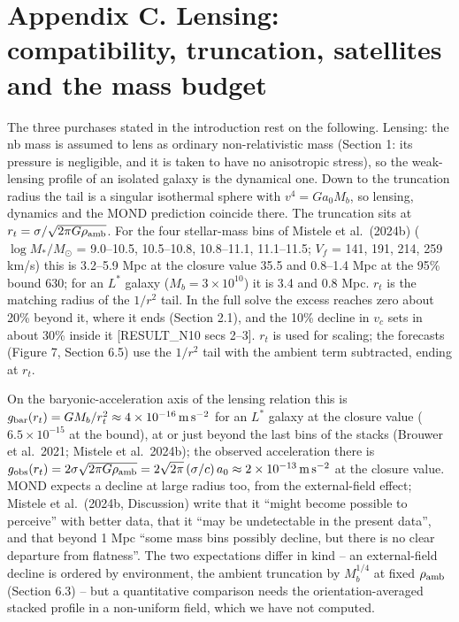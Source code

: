 \documentclass[
  10pt,
]{article}
\begin{document}
\section{Appendix C. Lensing: compatibility, truncation, satellites and the mass budget}\label{appendix-c.-lensing-compatibility-truncation-satellites-and-the-mass-budget}

The three purchases stated in the introduction rest on the following. Lensing: the nb mass is assumed to lens as ordinary non-relativistic mass (Section 1: its pressure is negligible, and it is taken to have no anisotropic stress), so the weak-lensing profile of an isolated galaxy is the dynamical one. Down to the truncation radius the tail is a singular isothermal sphere with $v^4=G a_0 M_b$, so lensing, dynamics and the MOND prediction coincide there. The truncation sits at $r_t=\sigma/\sqrt{2\pi G\rho_{\rm amb}}$. For the four stellar-mass bins of Mistele et al.~(2024b) ($\log M_*/M_\odot$ = 9.0--10.5, 10.5--10.8, 10.8--11.1, 11.1--11.5; $V_f$ = 141, 191, 214, 259 km/s) this is 3.2--5.9 Mpc at the closure value 35.5 and 0.8--1.4 Mpc at the 95\% bound 630; for an $L^*$ galaxy ($M_b=3\times10^{10}$) it is 3.4 and 0.8 Mpc. $r_t$ is the matching radius of the $1/r^2$ tail. In the full solve the excess reaches zero about 20\% beyond it, where it ends (Section 2.1), and the 10\% decline in $v_c$ sets in about 30\% inside it {[}RESULT\_N10 secs 2--3{]}. $r_t$ is used for scaling; the forecasts (Figure 7, Section 6.5) use the $1/r^2$ tail with the ambient term subtracted, ending at $r_t$.

On the baryonic-acceleration axis of the lensing relation this is $g_{\rm bar}(r_t)=GM_b/r_t^2\approx 4\times10^{-16}\,{\rm m\,s^{-2}}$ for an $L^*$ galaxy at the closure value ($6.5\times10^{-15}$ at the bound), at or just beyond the last bins of the stacks (Brouwer et al.~2021; Mistele et al.~2024b); the observed acceleration there is $g_{\rm obs}(r_t)=2\sigma\sqrt{2\pi G\rho_{\rm amb}}=2\sqrt{2\pi}\,(\sigma/c)\,a_0\approx 2\times10^{-13}\,{\rm m\,s^{-2}}$ at the closure value. MOND expects a decline at large radius too, from the external-field effect; Mistele et al.~(2024b, Discussion) write that it ``might become possible to perceive'' with better data, that it ``may be undetectable in the present data'', and that beyond 1 Mpc ``some mass bins possibly decline, but there is no clear departure from flatness''. The two expectations differ in kind -- an external-field decline is ordered by environment, the ambient truncation by $M_b^{1/4}$ at fixed $\rho_{\rm amb}$ (Section 6.3) -- but a quantitative comparison needs the orientation-averaged stacked profile in a non-uniform field, which we have not computed.
\end{document}
